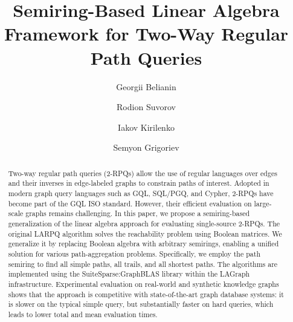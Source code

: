 \documentclass[sigconf,review]{acmart}
\begin{document}
\title{Semiring-Based Linear Algebra Framework for Two-Way Regular Path Queries}

\author{Georgii Belianin}

\author{Rodion Suvorov}

\author{Iakov Kirilenko}

\author{Semyon Grigoriev}

\renewcommand{\shortauthors}{Belyanin et al.}

\begin{abstract}
Two-way regular path queries (2-RPQs) allow the use of regular languages over edges and their inverses in edge-labeled graphs to constrain paths of interest.
Adopted in modern graph query languages such as GQL, SQL/PGQ, and Cypher, 2-RPQs have become part of the GQL ISO standard.
However, their efficient evaluation on large-scale graphs remains challenging.
In this paper, we propose a semiring-based generalization of the linear algebra approach for evaluating single-source 2-RPQs.
The original LARPQ algorithm solves the reachability problem using Boolean matrices.
We generalize it by replacing Boolean algebra with arbitrary semirings, enabling a unified solution for various path-aggregation problems.
Specifically, we employ the path semiring to find all simple paths, all trails, and all shortest paths.
The algorithms are implemented using the SuiteSparse:GraphBLAS library within the LAGraph infrastructure.
Experimental evaluation on real-world and synthetic knowledge graphs shows that the approach is competitive with state-of-the-art graph database systems: it is slower on the typical simple query, but substantially faster on hard queries, which leads to lower total and mean evaluation times.
\end{abstract}
\end{document}

